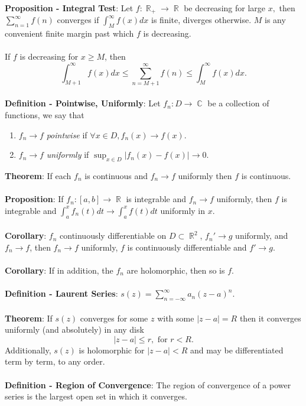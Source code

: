 \documentclass{article}
\DeclareMathOperator{\R}{\mathbb{R}}
\DeclareMathOperator{\C}{\mathbb{C}}
\begin{document}
\textbf{Proposition - Integral Test}: Let $f: \R_+ \rightarrow \R$ be decreasing for large $x,$ then $\sum_{n = 1}^\infty f(n)$ converges if $\int_{M}^\infty f(x)dx$ is finite, diverges otherwise. $M$ is any convenient finite margin past which $f$ is decreasing. \\ \\
If $f$ is decreasing for $x \geq M$, then $$\int_{M + 1}^\infty f(x)dx \leq \sum_{n = M + 1}^\infty f(n) \leq \int_{M}^\infty f(x)dx.$$ \\
\textbf{Definition - Pointwise, Uniformly}: Let $f_n: D \rightarrow \C$ be a collection of functions, we say that \begin{enumerate}
    \item $f_n \rightarrow f$ \textit{pointwise} if $\forall x \in D, f_n(x) \rightarrow f(x)$.
    \item $f_n \rightarrow f$ \textit{uniformly} if $\sup_{x \in D} |f_n(x) - f(x)| \rightarrow 0.$
\end{enumerate} $ $ \\
\textbf{Theorem}: If each $f_n$ is continuous and $f_n \rightarrow f$ uniformly then $f$ is continuous. \\ \\
\textbf{Proposition}: If $f_n: [a, b] \rightarrow \R$ is integrable and $f_n \rightarrow f$ uniformly, then $f$ is integrable and $\int_a^x f_n(t)dt \rightarrow \int_a^x f(t)dt$ uniformly in $x$. \\ \\
\textbf{Corollary}: $f_n$ continuously differentiable on $D \subset \R^2$, $f_n' \rightarrow g$ uniformly, and $f_n \rightarrow f$, then $f_n \rightarrow f$ uniformly, $f$ is continuously differentiable and $f' \rightarrow g$. \\ \\
\textbf{Corollary}: If in addition, the $f_n$ are holomorphic, then so is $f$. \\ \\
\textbf{Definition - Laurent Series}: $s(z) = \sum_{n = -\infty}^\infty a_n(z - a)^n$. \\ \\
\textbf{Theorem}: If $s(z)$ converges for some $z$ with some $|z - a| = R$ then it converges uniformly (and absolutely) in any disk $$|z - a| \leq r, \text{ for } r < R.$$ Additionally, $s(z)$ is holomorphic for $|z - a| < R$ and may be differentiated term by term, to any order. \\ \\
\textbf{Definition - Region of Convergence}: The region of convergence of a power series is the largest open set in which it converges. \\ \\
\end{document}
